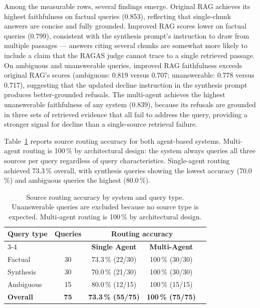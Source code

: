 Among the measurable rows, several findings emerge. Original RAG achieves its highest faithfulness on factual queries (0.853), reflecting that single-chunk answers are concise and fully grounded. Improved RAG scores lower on factual queries (0.799), consistent with the synthesis prompt's instruction to draw from multiple passages — answers citing several chunks are somewhat more likely to include a claim that the RAGAS judge cannot trace to a single retrieved passage. On ambiguous and unanswerable queries, improved RAG faithfulness exceeds original RAG's scores (ambiguous: 0.819 versus 0.707; unanswerable: 0.778 versus 0.717), suggesting that the updated decline instruction in the synthesis prompt produces better-grounded refusals. The multi-agent achieves the highest unanswerable faithfulness of any system (0.839), because its refusals are grounded in three sets of retrieved evidence that all fail to address the query, providing a stronger signal for decline than a single-source retrieval failure.

Table~\ref{tab:routing} reports source routing accuracy for both agent-based systems. Multi-agent routing is 100\,\% by architectural design: the system always queries all three sources per query regardless of query characteristics. Single-agent routing achieved 73.3\,\% overall, with synthesis queries showing the lowest accuracy (70.0\,\%) and ambiguous queries the highest (80.0\,\%).

\begin{table}[ht]
\centering
\caption{Source routing accuracy by system and query type. Unanswerable queries are excluded because no source type is expected. Multi-agent routing is 100\,\% by architectural design.}
\label{tab:routing}
\begin{tabular}{lcccc}
\hline
\textbf{Query type} & \textbf{Queries} & \multicolumn{2}{c}{\textbf{Routing accuracy}} \\
\cline{3-4}
& & \textbf{Single Agent} & \textbf{Multi-Agent} \\
\hline
Factual   & 30 & 73.3\,\% (22/30) & 100\,\% (30/30) \\
Synthesis & 30 & 70.0\,\% (21/30) & 100\,\% (30/30) \\
Ambiguous & 15 & 80.0\,\% (12/15) & 100\,\% (15/15) \\
\hline
\textbf{Overall} & \textbf{75} & \textbf{73.3\,\% (55/75)} & \textbf{100\,\% (75/75)} \\
\hline
\end{tabular}
\end{table}


